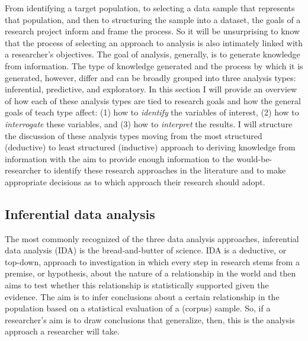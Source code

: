 \documentclass[
  letterpaper,
]{latex/krantz}
\begin{document}
From identifying a target population, to selecting a data sample that
represents that population, and then to structuring the sample into a
dataset, the goals of a research project inform and frame the process.
So it will be unsurprising to know that the process of selecting an
approach to analysis is also intimately linked with a researcher's
objectives. The goal of analysis, generally, is to generate knowledge
from information. The type of knowledge generated and the process by
which it is generated, however, differ and can be broadly grouped into
three analysis types: inferential, predictive, and exploratory. In this
section I will provide an overview of how each of these analysis types
are tied to research goals and how the general goals of teach type
affect: (1) how to \emph{identify} the variables of interest, (2) how to
\emph{interrogate} these variables, and (3) how to \emph{interpret} the
results. I will structure the discussion of these analysis types moving
from the most structured (deductive) to least structured (inductive)
approach to deriving knowledge from information with the aim to provide
enough information to the would-be-researcher to identify these research
approaches in the literature and to make appropriate decisions as to
which approach their research should adopt.

\hypertarget{inferential-data-analysis}{%
\subsection{Inferential data analysis}\label{inferential-data-analysis}}

The most commonly recognized of the three data analysis approaches,
inferential data analysis (IDA) is the bread-and-butter of science. IDA
is a deductive, or top-down, approach to investigation in which every
step in research stems from a premise, or hypothesis, about the nature
of a relationship in the world and then aims to test whether this
relationship is statistically supported given the evidence. The aim is
to infer conclusions about a certain relationship in the population
based on a statistical evaluation of a (corpus) sample. So, if a
researcher's aim is to draw conclusions that generalize, then, this is
the analysis approach a researcher will take.
\end{document}
